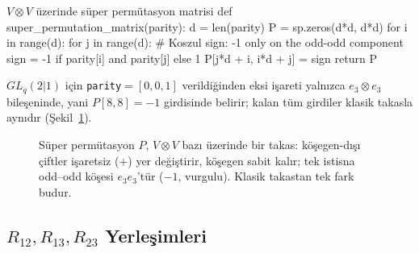 \documentclass[10pt]{math}
\numberwithin{equation}{section}
\theoremstyle{plain}
\theoremstyle{definition}
\begin{document}
\begin{pythoncode}{$V \otimes V$ üzerinde süper permütasyon matrisi}
def super_permutation_matrix(parity):
    d = len(parity)
    P = sp.zeros(d*d, d*d)
    for i in range(d):
        for j in range(d):
            # Koszul sign: -1 only on the odd-odd component
            sign = -1 if parity[i] and parity[j] else 1
            P[j*d + i, i*d + j] = sign
    return P
\end{pythoncode}

$GL_q(2|1)$ için \texttt{parity}$=[0,0,1]$ verildiğinden eksi işareti yalnızca
$e_3\otimes e_3$ bileşeninde, yani $P[8,8]=-1$ girdisinde belirir; kalan tüm
girdiler klasik takasla aynıdır (Şekil~\ref{fig:superperm}).

\begin{figure}[h]
\centering
{}
\caption{Süper permütasyon $P$, $V\otimes V$ bazı üzerinde bir takas: köşegen-dışı
çiftler işaretsiz ($+$) yer değiştirir, köşegen sabit kalır; tek istisna
odd--odd köşesi $e_3e_3$'tür ($-1$, vurgulu). Klasik takastan tek fark budur.}
\label{fig:superperm}
\end{figure}

\subsection{$R_{12}, R_{13}, R_{23}$ Yerleşimleri}
\end{document}
